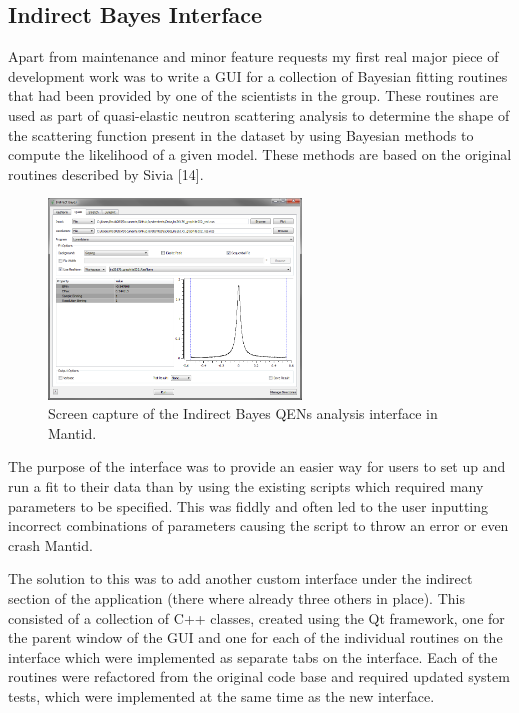 \documentclass[paper=a4, fontsize=11pt]{scrartcl}	%
\numberwithin{equation}{section}															%
\numberwithin{figure}{section}																%
\numberwithin{table}{section}
\begin{document}
\subsection{Indirect Bayes Interface}\label{indirect-bayes-interface}

Apart from maintenance and minor feature requests my first real major
piece of development work was to write a GUI for a collection of
Bayesian fitting routines that had been provided by one of the
scientists in the group. These routines are used as part of
quasi-elastic neutron scattering analysis to determine the shape of the
scattering function present in the dataset by using Bayesian methods to
compute the likelihood of a given model. These methods are based on the
original routines described by Sivia {[}14{]}.

\begin{figure}[H]
\centering
\includegraphics[width=0.6\textwidth]{img/iris-bayes-quasi.png}
\caption{Screen capture of the Indirect Bayes QENs analysis interface in Mantid.}
\label{fig:bayes-gui}
\end{figure}

The purpose of the interface was to provide an easier way for users to
set up and run a fit to their data than by using the existing scripts
which required many parameters to be specified. This was fiddly and
often led to the user inputting incorrect combinations of parameters
causing the script to throw an error or even crash Mantid.

The solution to this was to add another custom interface under the
indirect section of the application (there where already three others in
place). This consisted of a collection of C++ classes, created using the
Qt framework, one for the parent window of the GUI and one for each of
the individual routines on the interface which were implemented as
separate tabs on the interface. Each of the routines were refactored
from the original code base and required updated system tests, which
were implemented at the same time as the new interface.
\end{document}
